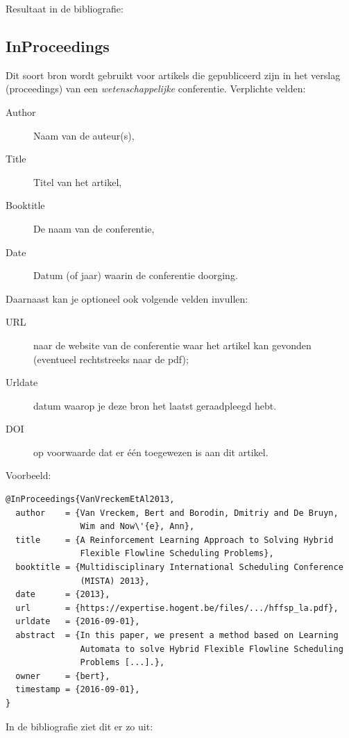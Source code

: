 Resultaat in de bibliografie:

\subsection{InProceedings}%
\label{ssec:inproceedings}

Dit soort bron wordt gebruikt voor artikels die gepubliceerd zijn in het verslag (proceedings) van een \emph{wetenschappelijke} conferentie. Verplichte velden:

\begin{description}
  \item[Author] Naam van de auteur(s),
  \item[Title] Titel van het artikel,
  \item[Booktitle] De naam van de conferentie,
  \item[Date] Datum (of jaar) waarin de conferentie doorging.
\end{description}

Daarnaast kan je optioneel ook volgende velden invullen:

\begin{description}
  \item[URL] naar de website van de conferentie waar het artikel kan gevonden (eventueel rechtstreeks naar de pdf);
  \item[Urldate] datum waarop je deze bron het laatst geraadpleegd hebt.
  \item[DOI] op voorwaarde dat er één toegewezen is aan dit artikel.
\end{description}

Voorbeeld:
\begin{verbatim}
@InProceedings{VanVreckemEtAl2013,
  author    = {Van Vreckem, Bert and Borodin, Dmitriy and De Bruyn,
               Wim and Now\'{e}, Ann},
  title     = {A Reinforcement Learning Approach to Solving Hybrid
               Flexible Flowline Scheduling Problems},
  booktitle = {Multidisciplinary International Scheduling Conference
               (MISTA) 2013},
  date      = {2013},
  url       = {https://expertise.hogent.be/files/.../hffsp_la.pdf},
  urldate   = {2016-09-01},
  abstract  = {In this paper, we present a method based on Learning
               Automata to solve Hybrid Flexible Flowline Scheduling 
               Problems [...].},
  owner     = {bert},
  timestamp = {2016-09-01},
}
\end{verbatim}

In de bibliografie ziet dit er zo uit: 

